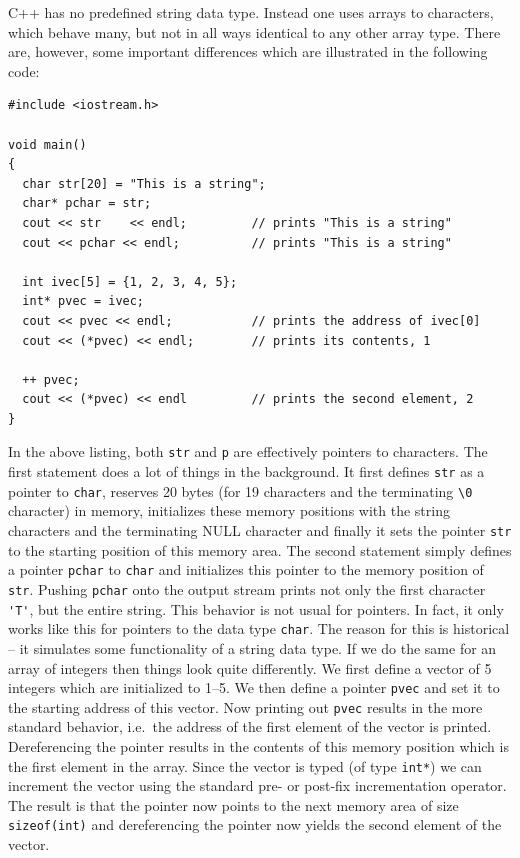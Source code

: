 C++ has no predefined string data type. Instead one uses arrays to
  characters, which behave
many, but not in all ways identical to any other array type. There are,
however, some important differences which are illustrated in the following
code:
{\small \begin{verbatim}
#include <iostream.h>

void main()
{
  char str[20] = "This is a string";
  char* pchar = str;
  cout << str    << endl;         // prints "This is a string"
  cout << pchar << endl;          // prints "This is a string"

  int ivec[5] = {1, 2, 3, 4, 5};
  int* pvec = ivec;
  cout << pvec << endl;           // prints the address of ivec[0]
  cout << (*pvec) << endl;        // prints its contents, 1

  ++ pvec;
  cout << (*pvec) << endl         // prints the second element, 2
}
\end{verbatim}}
\noindent
In the above listing, both \verb+str+ and \verb+p+ are effectively
pointers to characters. The first statement does a lot of things
in the background. It first defines \verb+str+ as
a pointer to \verb+char+, reserves 20 bytes (for 19 characters
and the terminating \verb+\0+ character) in memory, initializes these
memory positions with the string characters and the terminating NULL
character and finally it sets the pointer \verb+str+ to the starting position
of this memory area. The second statement simply defines a pointer
\verb+pchar+ to \verb+char+ and initializes this pointer to the memory position
of \verb+str+. Pushing \verb+pchar+ onto the output stream
prints not only the first character \verb+'T'+, but the entire string.
This behavior is not usual for pointers. In fact, it only works like
this for pointers to the data type \verb+char+. The reason for this
is historical -- it simulates some functionality of a string data type.
If we do the same
for an array of integers then things look quite differently. We
first define a vector of 5 integers which are initialized to 1--5.
We then define a pointer \verb+pvec+ and set it to the starting
address of this vector. Now printing out \verb+pvec+ results
in the more standard behavior, i.e.\ the address of the first element
of the vector is printed. Dereferencing the pointer results in the
contents of this memory position which is the first element in the
array. Since the vector is typed (of type \verb+int*+) we can
increment the vector using the standard pre- or post-fix incrementation
 
operator. The result is that the pointer now points to the next memory
area of size \verb+sizeof(int)+ and dereferencing the pointer now
yields the second element of the vector.

